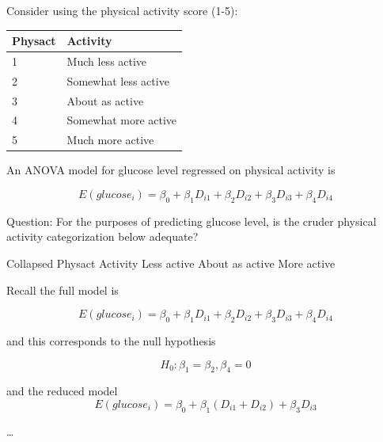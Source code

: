 \documentclass[
  letterpaper,
  DIV=11,
  numbers=noendperiod]{scrreport}
\begin{document}
Consider using the physical activity score (1-5):

\begin{longtable}[]{@{}ll@{}}
\toprule()
Physact & Activity \\
\midrule()
\endhead
1 & Much less active \\
2 & Somewhat less active \\
3 & About as active \\
4 & Somewhat more active \\
5 & Much more active \\
\bottomrule()
\end{longtable}

An ANOVA model for glucose level regressed on physical activity is

\[E(glucose_i) = \beta_0 + \beta_1D_{i1} + \beta_2D_{i2} + \beta_3D_{i3} + \beta_4 D_{i4}\]

Question: For the purposes of predicting glucose level, is the cruder
physical activity categorization below adequate?

\textbar Collapsed Physact\textbar{} Activity \textbar{}
\textbar{} Less active \textbar{} \textbar{} About as
active \textbar{} \textbar{} More active \textbar{}

Recall the full model is

\[E(glucose_i) = \beta_0 + \beta_1D_{i1} + \beta_2D_{i2} + \beta_3D_{i3} + \beta_4 D_{i4}\]

and this corresponds to the null hypothesis

\[H_0: \beta_1 = \beta_2, \beta_4 = 0\]

and the reduced model
\[E(glucose_i) = \beta_0 + \beta_1(D_{i1} + D_{i2}) + \beta_3D_{i3}\]

\ldots{}
\end{document}
